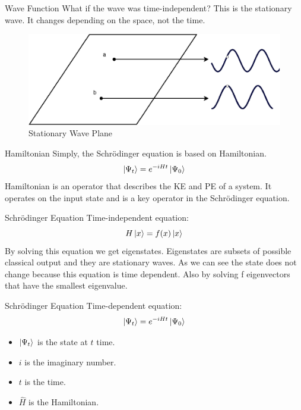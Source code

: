 \documentclass[14pt, aspectratio=169]{beamer}
\begin{document}
\begin{frame}{Wave Function}
    What if the wave was time-independent? This is the stationary wave. It changes depending on the space, not the time.
    \begin{figure}
        \centering
        \includegraphics[width=0.8\linewidth]{NewWave.eps}
        \caption{Stationary Wave Plane}
        \label{fig:enter-label}
    \end{figure}
\end{frame}

\begin{frame}{Hamiltonian}
    Simply, the Schrödinger equation is based on Hamiltonian.
    \[\ket{\Psi_{t}} = e^{-iHt}\ket{\Psi_{0}}\]
    Hamiltonian is an operator that describes the KE and PE of a system. It operates
    on the input state and is a key operator in the Schrödinger equation.
\end{frame}


\begin{frame}{Schrödinger Equation}
    Time-independent equation:
    \[H\ket{x} = f(x)\ket{x}\]
    By solving this equation we get eigenstates. Eigenstates are subsets of possible classical output and they are stationary waves. As we can see the state does not change because this equation is time dependent. Also by solving f eigenvectors that have the smallest eigenvalue.
\end{frame}

\begin{frame}{Schrödinger Equation}
    Time-dependent equation:
    \[\ket{\Psi_{t}} = e^{-iHt}\ket{\Psi_{0}}\]
    \begin{itemize}
        \item $\ket{\Psi_{t}}$ is the state at $t$ time.
        \item $i$ is the imaginary number.
        \item $t$ is the time.
        \item $\hat H$ is the Hamiltonian.
    \end{itemize}
\end{frame}
\end{document}
